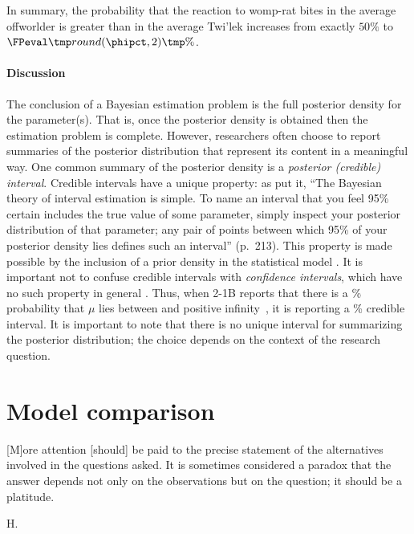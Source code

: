 In summary, the probability that the reaction to womp-rat bites in the average offworlder is greater than in the average Twi'lek increases from exactly $50\%$ to $\print[2]{\phipct}\%$.

\paragraph{Discussion} The conclusion of a Bayesian estimation problem is the full posterior density for the parameter{(s)}. That is, once the posterior density is obtained then the estimation problem is complete. However, researchers often choose to report summaries of the posterior distribution that represent its content in a meaningful way. One common summary of the posterior density is a \emph{posterior (credible) interval}. Credible intervals have a unique property: as  put it, ``The Bayesian theory of interval estimation is simple. To name an interval that you feel 95\% certain includes the true value of some parameter, simply inspect your posterior distribution of that parameter; any pair of points between which 95\% of your posterior density lies defines such an interval'' (p.~213). This property is made possible by the inclusion of a prior density in the statistical model \cite{Rouder2016freelunch}. It is important not to confuse credible intervals with \emph{confidence intervals}, which have no such property in general \cite{MoreyEtAlinpressCI}. Thus, when 2-1B reports that there is a \print[2]{\phipct}\% probability that $\mu$ lies between \va{ }and positive infinity~\units, it is reporting a \print[2]{\phipct}\% credible interval. It is important to note that there is no unique interval for summarizing the posterior distribution; the choice depends on the context of the research question.

\section*{Model comparison}
\epigraph{[M]ore attention [should] be paid to the precise statement of the alternatives involved in the questions asked. It is sometimes considered a paradox that the answer depends not only on the observations but on the question; it should be a platitude.}{H.~}

